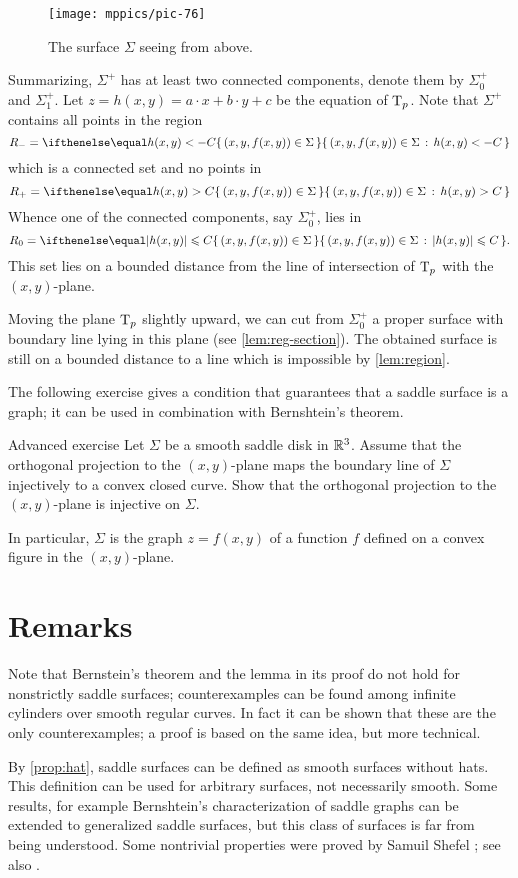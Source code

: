 \begin{figure}[h!]
\vskip-0mm
\centering
\texttt{[image: mppics/pic-76]}
\caption*{The surface $\Sigma$ seeing from above.}
\vskip0mm
\end{figure}

Summarizing, $\Sigma^+$ has at least two connected components, denote them by $\Sigma^+_0$ and $\Sigma^+_1$.
Let $z=h(x,y)=a\cdot x+b\cdot y+c$ be the equation of $\mathrm{T}_p$.
Note that $\Sigma^+$ contains all points in the region
\[R_-=\set{(x,y,f(x,y))\in\Sigma}{h(x,y)< -C}\] 
which is a connected set and no points in 
\[R_+=\set{(x,y,f(x,y))\in\Sigma}{h(x,y)> C}\]
Whence one of the connected components, say $\Sigma^+_0$, lies in 
\[R_0=\set{(x,y,f(x,y))\in\Sigma}{|h(x,y)|\le  C}.\]
This set lies on a bounded distance from the line of intersection of $\mathrm{T}_p$ with the $(x,y)$-plane.

Moving the plane $\mathrm{T}_p$ slightly upward, we can cut from $\Sigma^+_0$ a proper surface with boundary line lying in this plane (see \ref{lem:reg-section}).
The obtained surface is still on a bounded distance to a line
which is impossible by \ref{lem:region}.
\qeds

The following exercise gives a condition that guarantees that a saddle surface is a graph;
it can be used in combination with Bernshtein's theorem.

\begin{thm}{Advanced exercise}
Let $\Sigma$ be a smooth saddle disk in $\mathbb{R}^3$.
Assume that the orthogonal projection to the $(x,y)$-plane
maps the boundary line of $\Sigma$
injectively to a convex closed curve.
Show that the orthogonal projection to the $(x,y)$-plane is injective on $\Sigma$.

In particular, $\Sigma$ is the graph $z=f(x,y)$ of a function $f$ defined on a convex figure in the $(x,y)$-plane.
\end{thm}


\section*{Remarks}

Note that Bernstein's theorem and the lemma in its proof do not hold for nonstrictly saddle surfaces;
counterexamples can be found among infinite cylinders over smooth regular curves.
In fact it can be shown that these are the only counterexamples;
a proof is based on the same idea, but more technical.

By \ref{prop:hat}, saddle surfaces can be defined as smooth surfaces without hats.
This definition can be used for arbitrary surfaces, not necessarily smooth.
Some results, for example Bernshtein's characterization of saddle graphs can be extended to generalized saddle surfaces, but this class of surfaces is far from being understood.
Some nontrivial properties were proved by Samuil Shefel \cite{shefel}; see also \cite[Capter 4]{akp}.
